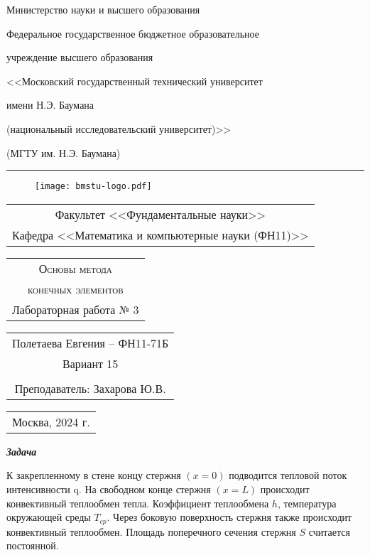 \documentclass[a4paper, 12pt]{article}
\begin{document}
	\pagestyle{empty} 
	\centerline{\large Министерство науки и высшего образования}	
	\centerline{\large Федеральное государственное бюджетное образовательное}
	\centerline{\large учреждение высшего образования}
	\centerline{\large <<Московский государственный технический университет}
	\centerline{\large имени Н.Э. Баумана}
	\centerline{\large (национальный исследовательский университет)>>}
	\centerline{\large (МГТУ им. Н.Э. Баумана)}
	\hrule
	\vspace{0.5cm}
	\begin{figure}[h]
		\center
		\texttt{[image: bmstu-logo.pdf]}
	\end{figure}
	\begin{center}
		\large	
		\begin{tabular}{c}
			Факультет <<Фундаментальные науки>> \\
			Кафедра <<Математика и компьютерные науки (ФН11)>>		
		\end{tabular}
	\end{center}
	\vspace{0.5cm}
	\begin{center}
		\LARGE \bf	
		\begin{tabular}{c}
			\textsc{Основы метода} \\
			\textsc{ конечных элементов} \\
			Лабораторная работа № 3 
		\end{tabular}
	\end{center}
	\vspace{0.5cm}
	\begin{center}
		\large	
		\begin{tabular}{c}
			Полетаева Евгения -- ФН11-71Б \\
			Вариант 15 \\ \\
			Преподаватель: Захарова Ю.В.
		\end{tabular}
	\end{center}
	\vfill
	\begin{center}
		\large	
		\begin{tabular}{c}
			Москва, 
			2024 г.
		\end{tabular}
	\end{center}
	\newpage
	\pagestyle{plain}
	
	\begin{center}
		\textit{\textbf{Задача }}
	\end{center}
	
	К закрепленному в стене концу стержня $(x=0)$ подводится тепловой поток
	интенсивности q. На свободном конце стержня $(x=L)$ происходит конвективный
	теплообмен тепла. Коэффициент теплообмена $h$, температура окружающей среды $T_{cp}$.
	Через боковую поверхность стержня также происходит конвективный теплообмен.
	Площадь поперечного сечения стержня $S$ считается постоянной.
	
\end{document}
